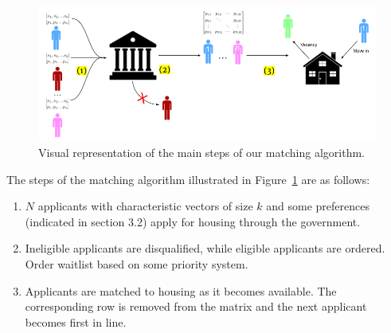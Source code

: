 \documentclass[11pt]{article}
\begin{document}
\begin{figure}[h!]
    \includegraphics[scale=0.65]{doc/Setup Image.png}
    \caption{Visual representation of the main steps of our matching algorithm.}
    \label{fig:schematic}
\end{figure}
\newline
The steps of the matching algorithm illustrated in Figure~\ref{fig:schematic} are as follows:
\begin{enumerate}
    \item $N$ applicants with characteristic vectors of size $k$ and some preferences (indicated in section 3.2) apply for housing through the government. 
    \item Ineligible applicants are disqualified, while eligible applicants are ordered. Order waitlist based on some priority system.
    \item Applicants are matched to housing as it becomes available. The corresponding row is removed from the matrix and the next applicant becomes first in line.
\end{enumerate}
\end{document}
